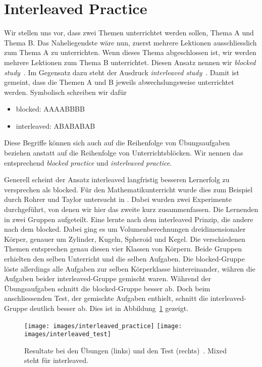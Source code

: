 \section{Interleaved Practice}
Wir stellen uns vor, dass zwei Themen unterrichtet werden sollen, Thema A und Thema B.
Das Naheliegendste wäre nun, zuerst mehrere Lektionen ausschliesslich zum Thema A zu unterrichten.
Wenn dieses Thema abgeschlossen ist, wir werden mehrere Lektionen zum Thema B unterrichtet.
Diesen Ansatz nennen wir \textit{blocked study}~\cite{Carvalho2014}.
Im Gegensatz dazu steht der Ausdruck \textit{interleaved study}~\cite{Carvalho2014}.
Damit ist gemeint, dass die Themen A und B jeweils abwechslungsweise unterrichtet werden.
Symbolisch schreiben wir dafür
\begin{itemize}
	\item blocked: AAAABBBB
	\item interleaved: ABABABAB
\end{itemize}
Diese Begriffe können sich auch auf die Reihenfolge von Übungsaufgaben beziehen anstatt auf die Reihenfolge von Unterrichtsblöcken.
Wir nennen das entsprechend \textit{blocked practice} und \textit{interleaved practice}.

Generell scheint der Ansatz \glqq{}interleaved\grqq{} langfristig besseren Lernerfolg zu versprechen als \glqq{}blocked\grqq{}.
Für den Mathematikunterricht wurde dies zum Beispiel durch Rohrer und Taylor untersucht in \cite{Rohrer2007}.
Dabei wurden zwei Experimente durchgeführt, von denen wir hier das zweite kurz zusammenfassen.
Die Lernenden in zwei Gruppen aufgeteilt.
Eine lernte nach dem \glqq{}interleaved\grqq{} Prinzip, die andere nach dem \glqq{}blocked\grqq{}.
Dabei ging es um Volumenberechnungen dreidimensionaler Körper, genauer um Zylinder, Kugeln, Spheroid und Kegel.
Die verschiedenen Themen entsprechen genau diesen vier Klassen von Körpern.
Beide Gruppen erhielten den selben Unterricht und die selben Aufgaben.
Die \glqq{}blocked\grqq{}-Gruppe löste allerdings alle Aufgaben zur selben Körperklasse hintereinander, währen die Aufgaben beider \glqq{}interleaved\grqq{}-Gruppe gemischt waren.
Während der Übungsaufgaben schnitt die \glqq{}blocked\grqq{}-Gruppe besser ab.
Doch beim anschliessenden Test, der gemischte Aufgaben enthielt, schnitt die \glqq{}interleaved\grqq{}-Gruppe deutlich besser ab.
Dies ist in Abbildung~\ref{fig:interleaved} gezeigt.

\begin{figure}[ht]
	\centering
	\texttt{[image: images/interleaved\_practice]}
	\hfill
	\texttt{[image: images/interleaved\_test]}
	\caption{Resultate bei den Übungen (links) und den Test (rechts)~\cite{Rohrer2007}. \glqq{}Mixed\grqq{} steht für \glqq{}interleaved\grqq{}.}
	\label{fig:interleaved}
\end{figure}

